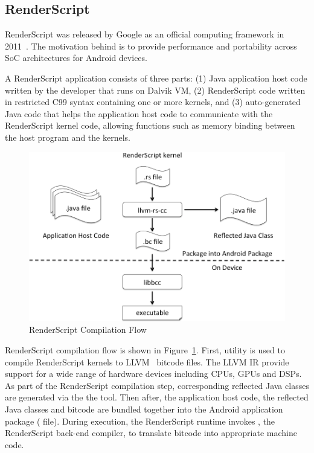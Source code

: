 
\subsection{RenderScript}
RenderScript was released by Google as an official computing framework in
2011~\cite{RenderScript}. The motivation behind is to provide
performance and portability across SoC architectures for Android devices.

A RenderScript application consists of three parts: (1) Java application host
code written by the developer that runs on Dalvik VM, (2) RenderScript code
written in restricted C99 syntax containing one or more kernels, and (3)
auto-generated Java code that helps the application host code to communicate with
the RenderScript kernel code, allowing functions such as memory binding between the
host program and the kernels.

\begin{figure}
\centering
\includegraphics[scale=0.28]{figs/renderscript-compile.png}
\caption{RenderScript Compilation Flow}
\label{fig:RSCompilation}
\centering
\end{figure}

RenderScript compilation flow is shown in Figure~\ref{fig:RSCompilation}.
First,  utility is used to compile RenderScript kernels to
LLVM~\cite{LLVM:CGO04} bitcode files. The LLVM IR provide support for a wide range of hardware
devices including CPUs, GPUs and DSPs. 
As part of the RenderScript compilation step, corresponding reflected Java classes
are generated via the  the  tool.
Then after, the application host code, the reflected Java classes and bitcode
are bundled together into the Android application package ( file).
During execution, the RenderScript
runtime invokes , the RenderScript back-end compiler, to translate
bitcode into appropriate machine code.


